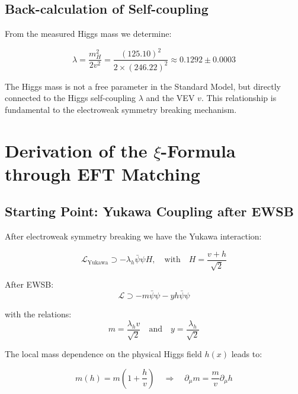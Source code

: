 \documentclass[12pt,a4paper]{report}
\begin{document}
	\subsection{Back-calculation of Self-coupling}
	
	From the measured Higgs mass we determine:
	
	\begin{equation}
		\lambda = \frac{m_H^2}{2v^2} = \frac{(125.10)^2}{2 \times (246.22)^2} \approx 0.1292 \pm 0.0003
	\end{equation}
	
	\begin{important}
		The Higgs mass is not a free parameter in the Standard Model, but directly connected to the Higgs self-coupling $\lambda$ and the VEV $v$. This relationship is fundamental to the electroweak symmetry breaking mechanism.
	\end{important}
	
	\section{Derivation of the $\xi$-Formula through EFT Matching}
	
	\subsection{Starting Point: Yukawa Coupling after EWSB}
	
	After electroweak symmetry breaking we have the Yukawa interaction:
	
	\begin{equation}
		\mathcal{L}_{\text{Yukawa}} \supset -\lambda_h \bar{\psi}\psi H, \quad \text{with} \quad H = \frac{v + h}{\sqrt{2}}
	\end{equation}
	
	After EWSB:
	\begin{equation}
		\mathcal{L} \supset -m \bar{\psi}\psi - y h \bar{\psi}\psi
	\end{equation}
	
	with the relations:
	\begin{equation}
		m = \frac{\lambda_h v}{\sqrt{2}} \quad \text{and} \quad y = \frac{\lambda_h}{\sqrt{2}}
	\end{equation}
	
	The local mass dependence on the physical Higgs field $h(x)$ leads to:
	
	\begin{equation}
		m(h) = m\left(1 + \frac{h}{v}\right) \quad \Rightarrow \quad \partial_\mu m = \frac{m}{v}\partial_\mu h
	\end{equation}
	
\end{document}
